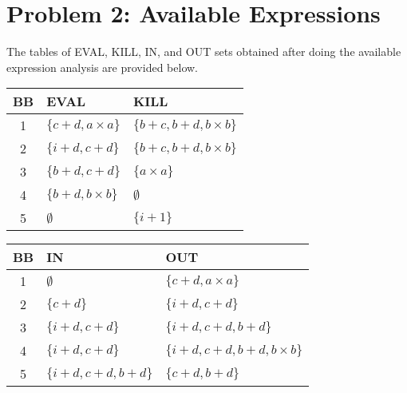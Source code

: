 \section*{Problem 2: Available Expressions}

The tables of EVAL, KILL, IN, and OUT sets obtained after doing the available expression analysis are provided below. 

\begin{table}[!ht]
\centering
\begin{tabular}{|c|l|l|}
\hline
\textbf{BB} & \textbf{EVAL} & \textbf{KILL}\\
\hline
1 & $\{c+d,a \times a\}$ & $\{b+c,b+d,b \times b\}$ \\
\hline
2 & $\{i+d,c+d\}$ & $\{b+c,b+d,b \times b\}$ \\
\hline
3 & $\{b+d,c+d\}$ & $\{a \times a\}$ \\
\hline
4 & $\{b+d,b \times b\}$ & $\emptyset$ \\
\hline
5 & $\emptyset$ & $\{i+1\}$ \\
\hline
\end{tabular}
\end{table}

\begin{table}[!ht]
\centering
\begin{tabular}{|c|l|l|}
\hline
\textbf{BB} & \textbf{IN} & \textbf{OUT}\\
\hline
1 & $\emptyset$ & $\{c+d,a \times a\}$ \\
\hline
2 & $\{c+d\}$ & $\{i+d,c+d\}$ \\
\hline
3 & $\{i+d,c+d\}$ & $\{i+d,c+d,b+d\}$ \\
\hline
4 & $\{i+d,c+d\}$ & $\{i+d,c+d,b+d,b \times b\}$ \\
\hline
5 & $\{i+d,c+d,b+d\}$ & $\{c+d,b+d\}$ \\
\hline
\end{tabular}
\end{table}